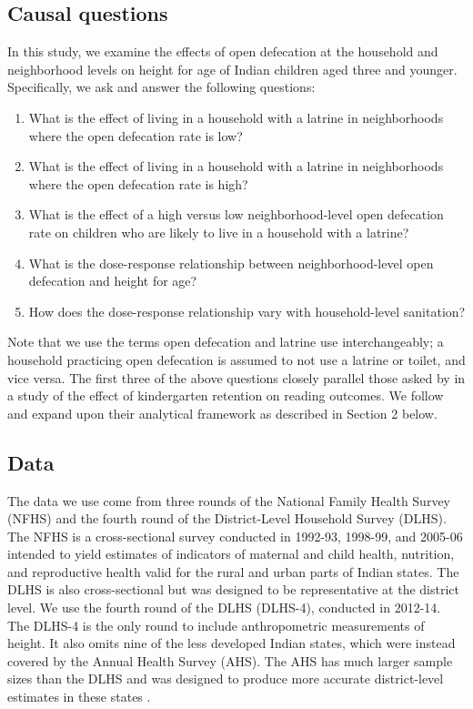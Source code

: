 \documentclass[11pt,a4paper]{article}
\begin{document}
\subsection{Causal questions}
In this study, we examine the effects of open defecation at the household and neighborhood levels on height for age of Indian children aged three and younger. Specifically, we ask and answer the following questions:
\begin{enumerate}
	\item What is the effect of living in a household with a latrine in neighborhoods where the open defecation rate is low?
	\item What is the effect of living in a household with a latrine in neighborhoods where the open defecation rate is high?
	\item What is the effect of a high versus low neighborhood-level open defecation rate on children who are likely to live in a household with a latrine?
	\item What is the dose-response relationship between neighborhood-level open defecation and height for age?
	\item How does the dose-response relationship vary with household-level sanitation?
\end{enumerate}
Note that we use the terms open defecation and latrine use interchangeably; a household practicing open defecation is assumed to not use a latrine or toilet, and vice versa. The first three of the above questions closely parallel those asked by \cite{hong_raudenbush} in a study of the effect of kindergarten retention on reading outcomes. We follow and expand upon their analytical framework as described in Section 2 below.

\subsection{Data}
The data we use come from three rounds of the National Family Health Survey (NFHS) and the fourth round of the District-Level Household Survey (DLHS). The NFHS is a cross-sectional survey conducted in 1992-93, 1998-99, and 2005-06 intended to yield estimates of indicators of maternal and child health, nutrition, and reproductive health valid for the rural and urban parts of Indian states. The DLHS is also cross-sectional but was designed to be representative at the district level. We use the fourth round of the DLHS (DLHS-4), conducted in 2012-14. The DLHS-4 is the only round to include anthropometric measurements of height. It also omits nine of the less developed Indian states, which were instead covered by the Annual Health Survey (AHS). The AHS has much larger sample sizes than the DLHS and was designed to produce more accurate district-level estimates in these states \citep{dandona}.
\end{document}
